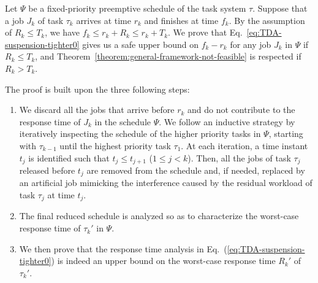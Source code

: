 


Let $\Psi$ be a fixed-priority preemptive schedule of the task system $\tau$.
Suppose that a job $J_{k}$ of task $\tau_k$ arrives at time $r_k$ and finishes at time $f_k$. 
By the assumption of $R_k \leq T_k$, we have $f_k \leq r_k+R_k \leq r_k+T_k$.
We prove that Eq.~\eqref{eq:TDA-suspension-tighter0} gives us a safe upper bound on $f_k-r_k$ for any job $J_k$ in $\Psi$ if $R_k \leq T_k$, and Theorem~\ref{theorem:general-framework-not-feasible} is respected if $R_k > T_k$.


The proof is built upon the three following steps:
\begin{enumerate}
\item We discard all the jobs that arrive before $r_k$ and do not contribute to the response time of $J_k$ in the schedule $\Psi$. We follow an inductive strategy by iteratively inspecting the schedule of the higher priority tasks in $\Psi$, starting with $\tau_{k-1}$ until the highest priority task $\tau_1$. At each iteration, a time instant $t_j$ is identified such that $t_j \leq t_{j+1}$ ($1 \leq j < k$). Then, all the jobs of task $\tau_j$ released before $t_j$ are removed from the schedule and, if needed, replaced by an artificial job mimicking the interference caused by the residual workload of task $\tau_j$ at time $t_j$. %
\item The final reduced schedule is analyzed so as to characterize the
  worst-case response time of $\tau_k'$ in $\Psi$. %
\item We then prove that the response time analysis in Eq.~(\ref{eq:TDA-suspension-tighter0}) is indeed an upper bound on the worst-case response time $R_k'$ of $\tau_k'$.
\end{enumerate}


